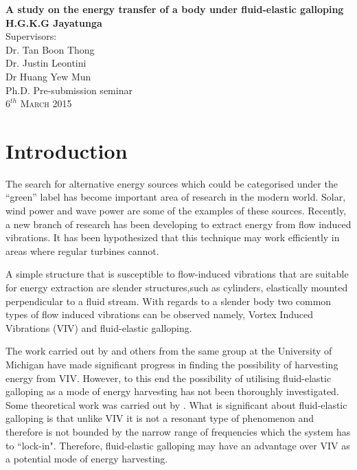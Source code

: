 \documentclass[authoryear,12pt]{article}
\begin{document}
\begin{titlepage}
\begin{center}
{\huge \bfseries A study on the energy transfer of a body under fluid-elastic galloping}\\[2.5cm]
{\LARGE \bfseries H.G.K.G Jayatunga}\\[1.5cm]
\Large Supervisors:\\[0.5cm] Dr. Tan Boon Thong \\[0.4cm] Dr. Justin Leontini \\[0.5cm] Dr Huang Yew Mun\\[6.5cm]
\Large Ph.D. Pre-submission seminar\\

\vfill
\textsc{\Large $6^{{th}}$ March 2015}
\end{center}
\end{titlepage}
\tableofcontents
\clearpage

\section{Introduction}
\label{sec:intro}
The search for alternative energy sources which could be categorised under the ``green” label has become important area of research in the modern world. Solar, wind power and wave power are some of the examples of these sources. Recently, a new branch of research has been developing to extract energy from flow induced vibrations. It has been hypothesized that this technique may work efficiently in areas where regular turbines cannot.
 
A simple structure that is susceptible to flow-induced vibrations that are suitable for energy extraction are slender structures,such as cylinders, elastically mounted perpendicular to a fluid stream. With regards to a slender body two common types of flow induced vibrations can be observed namely, Vortex Induced Vibrations (VIV) and fluid-elastic galloping. 

The work carried out by \citet{Bernitsas2008a-concept, Bernitsas2009, Raghavan2010a,Lee2011b} and others from the same group at the University of Michigan have made significant progress in finding the possibility of harvesting energy from VIV. However, to this end the possibility of utilising fluid-elastic galloping as a mode of energy harvesting has not been thoroughly investigated. Some theoretical work was carried out by \cite{Barrero-Gil2010a}. What is significant about fluid-elastic galloping is that unlike VIV it is not a resonant type of phenomenon and therefore is not bounded by the narrow range of frequencies which the system has to ``lock-in". Therefore, fluid-elastic galloping may have an advantage over VIV as a potential mode of energy harvesting. 
\end{document}
